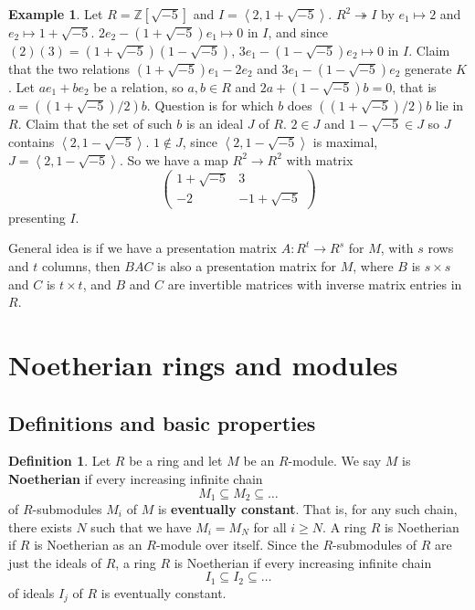\documentclass{article}
\newcommand{\Z}{\mathbb{Z}}
\newcommand{\rb}[1]{\left( #1 \right)}
\renewcommand{\sb}[1]{\left[ #1 \right]}
\newcommand{\ab}[1]{\left\langle #1 \right\rangle}
\newcommand{\two}[2]{\begin{pmatrix} #1 \\ #2 \end{pmatrix}}
\theoremstyle{definition}\newtheorem{definition}{Definition}[subsection]
\theoremstyle{definition}\newtheorem{remark}[definition]{Remark}
\theoremstyle{definition}\newtheorem*{example}{Example}
\theoremstyle{definition}\newtheorem*{note}{Note}
\begin{document}
\begin{example}
Let $ R = \Z\sb{\sqrt{-5}} $ and $ I = \ab{2, 1 + \sqrt{-5}} $. $ R^2 \twoheadrightarrow I $ by $ e_1 \mapsto 2 $ and $ e_2 \mapsto 1 + \sqrt{-5} $. $ 2e_2 - \rb{1 + \sqrt{-5}}e_1 \mapsto 0 $ in $ I $, and since $ \rb{2}\rb{3} = \rb{1 + \sqrt{-5}}\rb{1 - \sqrt{-5}} $, $ 3e_1 - \rb{1 - \sqrt{-5}}e_2 \mapsto 0 $ in $ I $. Claim that the two relations $ \rb{1 + \sqrt{-5}}e_1 - 2e_2 $ and $ 3e_1 - \rb{1 - \sqrt{-5}}e_2 $ generate $ K $. Let $ ae_1 + be_2 $ be a relation, so $ a, b \in R $ and $ 2a + \rb{1 - \sqrt{-5}}b = 0 $, that is $ a = \rb{\rb{1 + \sqrt{-5}} / 2}b $. Question is for which $ b $ does $ \rb{\rb{1 + \sqrt{-5}} / 2}b $ lie in $ R $. Claim that the set of such $ b $ is an ideal $ J $ of $ R $. $ 2 \in J $ and $ 1 - \sqrt{-5} \in J $ so $ J $ contains $ \ab{2, 1 - \sqrt{-5}} $. $ 1 \notin J $, since $ \ab{2, 1 - \sqrt{-5}} $ is maximal, $ J = \ab{2, 1 - \sqrt{-5}} $. So we have a map $ R^2 \to R^2 $ with matrix
$$ \two{1 + \sqrt{-5} & 3}{-2 & -1 + \sqrt{-5}} $$
presenting $ I $.
\end{example}

General idea is if we have a presentation matrix $ A : R^t \to R^s $ for $ M $, with $ s $ rows and $ t $ columns, then $ BAC $ is also a presentation matrix for $ M $, where $ B $ is $ s \times s $ and $ C $ is $ t \times t $, and $ B $ and $ C $ are invertible matrices with inverse matrix entries in $ R $.

\section{Noetherian rings and modules}

\subsection{Definitions and basic properties}

\begin{definition}
Let $ R $ be a ring and let $ M $ be an $ R $-module. We say $ M $ is \textbf{Noetherian} if every increasing infinite chain
$$ M_1 \subseteq M_2 \subseteq \dots $$
of $ R $-submodules $ M_i $ of $ M $ is \textbf{eventually constant}. That is, for any such chain, there exists $ N $ such that we have $ M_i = M_N $ for all $ i \ge N $. A ring $ R $ is Noetherian if $ R $ is Noetherian as an $ R $-module over itself. Since the $ R $-submodules of $ R $ are just the ideals of $ R $, a ring $ R $ is Noetherian if every increasing infinite chain
$$ I_1 \subseteq I_2 \subseteq \dots $$
of ideals $ I_j $ of $ R $ is eventually constant.
\end{definition}
\end{document}
